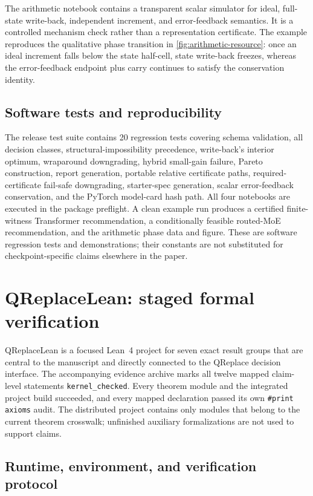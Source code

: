 \documentclass[twoside,11pt]{article}
\begin{document}
The arithmetic notebook contains a transparent scalar simulator for ideal,
full-state write-back, independent increment, and error-feedback semantics.  It
is a controlled mechanism check rather than a representation certificate.  The
example reproduces the qualitative phase transition in
\cref{fig:arithmetic-resource}: once an ideal increment falls below the state
half-cell, state write-back freezes, whereas the error-feedback endpoint plus
carry continues to satisfy the conservation identity.

\subsection{Software tests and reproducibility}
\label{app:qreplace-tests}

The release test suite contains 20 regression tests covering schema validation,
all decision classes, structural-impossibility precedence, write-back's
interior optimum, wraparound downgrading, hybrid small-gain failure, Pareto
construction, report generation, portable relative certificate paths,
required-certificate fail-safe downgrading, starter-spec generation, scalar
error-feedback conservation, and the PyTorch model-card hash path.  All four
notebooks are executed in the package
preflight.  A clean example run produces a certified finite-witness Transformer
recommendation, a conditionally feasible routed-MoE recommendation, and the
arithmetic phase data and figure.  These are software regression tests and
demonstrations; their constants are not substituted for checkpoint-specific
claims elsewhere in the paper.

\section{QReplaceLean: staged formal verification}
\label{app:lean-verification}

QReplaceLean is a focused Lean~4 project for seven exact result groups that are
central to the manuscript and directly connected to the QReplace decision
interface.  The accompanying evidence archive marks all twelve mapped
claim-level statements \texttt{kernel\_checked}.  Every theorem module and the
integrated project build succeeded, and every mapped declaration passed its own
\texttt{\#print axioms} audit.  The distributed project contains only modules
that belong to the current theorem crosswalk; unfinished auxiliary
formalizations are not used to support claims.

\subsection{Runtime, environment, and verification protocol}
\label{app:lean-status}
\end{document}
